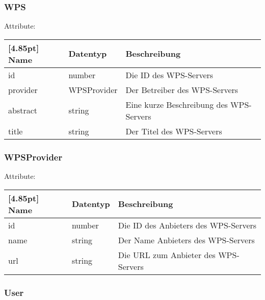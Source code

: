     		\subsubsection{WPS}
    		
    		Attribute:
            \begin{center}
            	\renewcommand{\arraystretch}{1.5}
                \setlength\tabcolsep{5pt}
            	\begin{tabularx}{\textwidth}{|l|l|X|}
            		\hline
                    \rowcolor[gray]{0.75}[4.85pt]            		
                    Name & Datentyp & Beschreibung \\ \hline
            		id & number & Die ID des WPS-Servers \\ \hline
            		provider & WPSProvider & Der Betreiber des WPS-Servers \\ \hline
            		abstract & string & Eine kurze Beschreibung des WPS-Servers \\ \hline
            		title & string & Der Titel des WPS-Servers \\ \hline
            	\end{tabularx}
            \end{center}
                
    		\subsubsection{WPSProvider}
    		
    		Attribute:
            \begin{center}
            	\renewcommand{\arraystretch}{1.5}
                \setlength\tabcolsep{5pt}
            	\begin{tabularx}{\textwidth}{|l|l|X|}
            		\hline
                    \rowcolor[gray]{0.75}[4.85pt]            		
                    Name & Datentyp & Beschreibung \\ \hline
            		id & number & Die ID des Anbieters des WPS-Servers  \\ \hline
            		name & string & Der Name Anbieters des WPS-Servers \\ \hline
            		url & string & Die URL zum Anbieter des WPS-Servers \\ \hline
            	\end{tabularx}
            \end{center}
                
    		\subsubsection{User}
            
